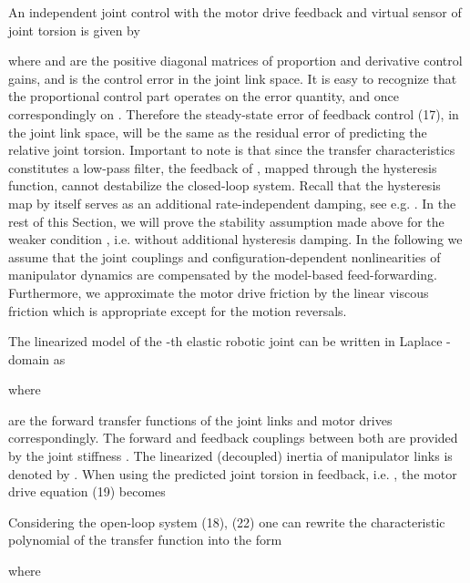 \documentclass[a4paper, 10pt, conference]{ieeeconf}
\begin{document}
An independent joint control with the motor drive feedback and
virtual sensor of joint torsion is  given by

where  and  are the positive diagonal matrices of
proportion and derivative control gains, and 
is the control error in the joint link space. It is easy to
recognize that the proportional control part operates on the
 error quantity, and once
 correspondingly on .
Therefore the steady-state error of feedback control (17), in the
joint link space, will be the same as the residual error of
predicting the relative joint torsion. Important to note is that
since the  transfer characteristics
constitutes a low-pass filter, the feedback of ,
mapped through the hysteresis function, cannot destabilize the
closed-loop system. Recall that the hysteresis map  by itself serves as an additional
rate-independent damping, see e.g. \cite{Lazan68}. In the rest of
this Section, we will prove the stability assumption made above
for the weaker condition ,
i.e. without additional hysteresis damping. In the following we
assume that the joint couplings and configuration-dependent
nonlinearities of manipulator dynamics are compensated by the
model-based feed-forwarding. Furthermore, we approximate the motor
drive friction by the linear viscous friction  which is appropriate except for the motion
reversals.

The linearized model of the -th elastic robotic
joint can be written in
Laplace -domain as

where

are the forward transfer functions of the joint links and motor
drives correspondingly. The forward and feedback couplings between
both are provided by the joint stiffness . The linearized
(decoupled) inertia of manipulator links is denoted by .
When using the predicted joint torsion in feedback, i.e. , the motor drive equation (19) becomes

Considering the open-loop system (18), (22) one can rewrite the
characteristic polynomial of the transfer function  into the form

where
\end{document}
